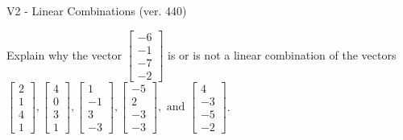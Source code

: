 \begin{exercise}
  \begin{exerciseTitle}V2 - Linear Combinations (ver. 440)\end{exerciseTitle}
  \begin{exerciseStatement}
    Explain why the vector \(\left[\begin{array}{c}
-6 \\
-1 \\
-7 \\
-2
\end{array}\right]\)  is or is not a linear 
	combination of the vectors \(\left[\begin{array}{c}
2 \\
1 \\
4 \\
1
\end{array}\right] , \left[\begin{array}{c}
4 \\
0 \\
3 \\
1
\end{array}\right] , \left[\begin{array}{c}
1 \\
-1 \\
3 \\
-3
\end{array}\right] , \left[\begin{array}{c}
-5 \\
2 \\
-3 \\
-3
\end{array}\right] , \text{ and } \left[\begin{array}{c}
4 \\
-3 \\
-5 \\
-2
\end{array}\right]\).
	



\end{exerciseStatement}
\end{exercise}
